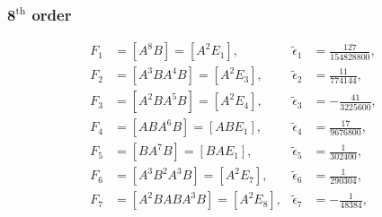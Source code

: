 \documentclass[12pt]{article}
\begin{document}
\subsubsection*{$\mathbf{8}^{\textrm{th}}$ order}

\vspace{0.1cm}

\begin{equation}
  \begin{aligned}
    \nonumber
    F_{1} &= \left [ A^{8} B \right ] = \left [ A^{2} E_{1} \right ], & \tilde{\epsilon}_{1} &= \frac{127}{154 828 800}, \\
    F_{2} &= \left [ A^{3} B A^{4} B \right ] = \left [ A^{2} E_{3} \right ], & \tilde{\epsilon}_{2} &= \frac{11}{774 144}, \\
    F_{3} &= \left [ A^{2} B A^{5} B \right ] = \left [ A^{2} E_{4} \right ], & \tilde{\epsilon}_{3} &= - \frac{41}{3 225 600}, \\
    F_{4} &= \left [ A B A^{6} B \right ] = \left [ A B E_{1} \right ], & \tilde{\epsilon}_{4} &= \frac{17}{9 676 800}, \\
    F_{5} &= \left [ B A^{7} B \right ] = \left [ B A E_{1} \right ], & \tilde{\epsilon}_{5} &= \frac{1}{302 400}, \\
    F_{6} &= \left [ A^{3} B^{2} A^{3} B \right ] = \left [ A^{2} E_{7} \right ], & \tilde{\epsilon}_{6} &= \frac{1}{290 304}, \\
    F_{7} &= \left [ A^{2} B A B A^{3} B \right ] = \left [ A^{2} E_{8} \right ], & \tilde{\epsilon}_{7} &= - \frac{1}{48 384},
  \end{aligned}
\end{equation}

\vspace{0.1cm}
\end{document}
